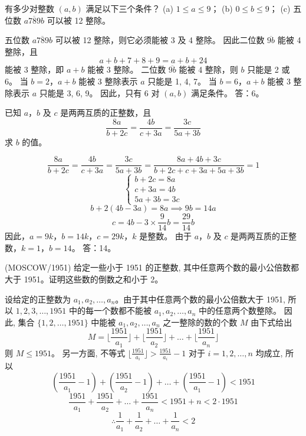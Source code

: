 \begin{questions}
\question 有多少对整数 $(a, b)$ 满足以下三个条件？
(a) $1 \le a \le 9$；
(b) $0 \le b \le 9$；
(c) 五位数 $\overline{a789b}$ 可以被 12 整除。

\begin{solution}
五位数 $\overline{a789b}$ 可以被 12 整除，则它必须能被 3 及 4 整除。
因此二位数 $\overline{9b}$ 能被 4 整除，且
\[
a + b + 7 + 8 + 9 = a + b + 24
\]
能被 3 整除，即 $a + b$ 能被 3 整除。
二位数 $\overline{9b}$ 能被 4 整除，则 $b$ 只能是 2 或 6。
当 $b = 2$，$a + b$ 能被 3 整除表示 $a$ 只能是 1, 4, 7。
当 $b = 6$，$a + b$ 能被 3 整除表示 $a$ 只能是 3, 6, 9。
因此，只有 6 对 $(a, b)$ 满足条件。
答：6。
\end{solution}

\question 已知 $a$，$b$ 及 $c$ 是两两互质的正整数，且
\[
\frac{8a}{b + 2c} = \frac{4b}{c + 3a} = \frac{3c}{5a + 3b}
\]
求 $b$ 的值。

\begin{solution}
\[
\frac{8a}{b + 2c} = \frac{4b}{c + 3a} = \frac{3c}{5a + 3b} = \frac{8a + 4b + 3c}{b + 2c + c + 3a + 5a + 3b} = 1
\]
\[
\begin{cases}
b + 2c = 8a \\
c + 3a = 4b \\
5a + 3b = 3c
\end{cases}
\]
\[
b + 2(4b - 3a) = 8a \implies 9b = 14a
\]
\[
c = 4b - 3 \times \frac{9}{14} b = \frac{29}{14} b
\]
因此，$a = 9k$，$b = 14k$，$c = 29k$，$k$ 是整数。
由于 $a$，$b$ 及 $c$ 是两两互质的正整数，$k = 1$，$b = 14$。
答：14。
\end{solution}

\question (MOSCOW/1951) 给定一些小于 1951 的正整数, 其中任意两个数的最小公倍数都大于 1951。证明这些数的倒数之和小于 2。

\begin{solution}
设给定的正整数为 $a_1, a_2, \dots, a_n$。由于其中任意两个数的最小公倍数大于 1951, 所以 $1, 2, 3, \dots, 1951$ 中的每一个数都不能被 $a_1, a_2, \dots, a_n$ 中的任意两个数整除。
因此, 集合 $\{1, 2, \dots, 1951\}$ 中能被 $a_1, a_2, \dots, a_n$ 之一整除的数的个数 $M$ 由下式给出
\[
M = \lfloor \frac{1951}{a_1} \rfloor + \lfloor \frac{1951}{a_2} \rfloor + \dots + \lfloor \frac{1951}{a_n} \rfloor
\]
则 $M \le 1951$。
另一方面, 不等式 $\lfloor \frac{1951}{a_i} \rfloor > \frac{1951}{a_i} - 1$ 对于 $i = 1, 2, \dots, n$ 均成立, 所以
\[
\left( \frac{1951}{a_1} - 1 \right) + \left( \frac{1951}{a_2} - 1 \right) + \dots + \left( \frac{1951}{a_1} - 1 \right) < 1951
\]
\[
\frac{1951}{a_1} + \frac{1951}{a_2} + \dots + \frac{1951}{a_n} < 1951 + n < 2 \cdot 1951
\]
\[
\therefore \frac{1}{a_1} + \frac{1}{a_2} + \dots + \frac{1}{a_n} < 2
\]
\end{solution}


\end{questions}
